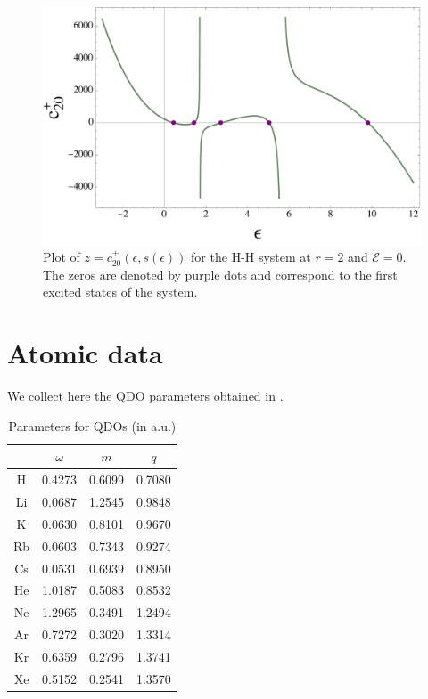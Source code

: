 \documentclass[reprint, amsmath, amssymb, aps, prl]{revtex4-2}
\begin{document}
    \begin{figure}[h!]
        \centering
            \includegraphics[scale=0.33]{rational_tau0_r2_HH}
            \caption{\label{fig:rational} Plot of  $z=c^+_{20}(\epsilon, s(\epsilon))$ for the H-H system at $r=2$ and $\mathcal E=0$. The zeros are denoted by purple dots and correspond to the first excited states of the system.}
    \end{figure}



\newpage

\appendix

\section{Atomic data}

    We collect here the QDO parameters obtained in \cite{PhysRevB.87.144103}.

    \begin{table}[h!]
    \caption{\label{tab:atomic_data} Parameters for QDOs (in a.u.)}
    \begin{ruledtabular}
    \begin{tabular}{c|ccc}
        & $\omega$ & $m$ & $q$ \\
        \hline
        H  & 0.4273 & 0.6099 & 0.7080 \\
        Li & 0.0687 & 1.2545 & 0.9848 \\
        K  & 0.0630 & 0.8101 & 0.9670 \\
        Rb & 0.0603 & 0.7343 & 0.9274 \\
        Cs & 0.0531 & 0.6939 & 0.8950 \\
        He & 1.0187 & 0.5083 & 0.8532 \\
        Ne & 1.2965 & 0.3491 & 1.2494 \\
        Ar & 0.7272 & 0.3020 & 1.3314 \\
        Kr & 0.6359 & 0.2796 & 1.3741 \\
        Xe & 0.5152 & 0.2541 & 1.3570
    \end{tabular}
    \end{ruledtabular}
    \end{table}
\end{document}
